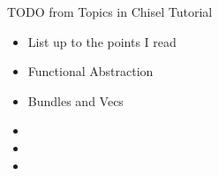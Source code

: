 \begin{frame}[fragile]{TODO from Topics in Chisel Tutorial}
\begin{itemize}
\item List up to the points I read
\item Functional Abstraction
\item Bundles and Vecs
\item 
\item 
\item 
\end{itemize}
\end{frame}

